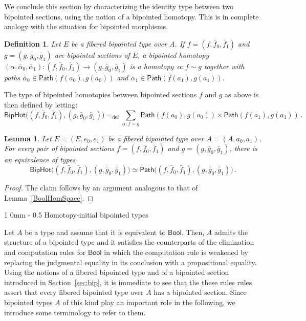 \documentclass[10pt,a4paper,oneside,reqno]{amsart}
\makeatletter
\numberwithin{equation}{section}
\renewcommand{\section}{\@startsection
  {section}%
   {1}%
  {0mm}%
   {-\baselineskip}%
  {0.5\baselineskip}%
   {\Large\bfseries}}%
\theoremstyle{mythm}
\newtheorem{lemma}[theorem]{Lemma}
\theoremstyle{mydef}
\newtheorem{definition}[theorem]{Definition}
\theoremstyle{myrmk}
\newcommand{\defeq}{=_{\mathrm{def}}}
\newcommand{\co}{\colon}
\newcommand{\Id}{\mathsf{Path}}
\newcommand{\Bool}{\mathsf{Bool}}
\newcommand{\BipHot}{\mathsf{BipHot}}
\makeatother
\begin{document}
We conclude this section by characterizing the identity type between two bipointed sections, using
the notion of a bipointed homotopy. This is in complete analogy with the situation for bipointed
morphisms.


\begin{definition} \label{def:2cellsection} Let $E$ be a fibered bipointed type over $A$. If $f = (f, \bar{f}_0,\bar{f}_1)$ and $g = (g, \bar{g}_0, \bar{g}_1)$ are bipointed sections of $E$, a \emph{bipointed homotopy} 
$(\alpha, \bar{\alpha}_0, \bar{\alpha}_1) \co (f, \bar{f}_0, \bar{f}_1)  \rightarrow (g, \bar{g}_0, \bar{g}_1)$ 
is a homotopy~$\alpha \co f \sim g$ together with paths $\bar{\alpha}_0 \in \Id( f(a_0),  g(a_0))$ and $\bar{\alpha}_1 \in \Id ( f(a_1) , g(a_1))$. 
\end{definition} 

The type of bipointed homotopies between bipointed sections $f$ and $g$ as above is then defined by letting:
\[
\BipHot \big( (f, \bar{f}_0, \bar{f}_1), (g, \bar{g}_0, \bar{g}_1) \big) \defeq
\sum_{\alpha \co f \sim g} \Id ( f(a_0), g(a_0) ) \times \Id ( f(a_1) , g(a_1) ) \, .
\]


\begin{lemma} Let $E = (E, e_0, e_1)$ be a fibered bipointed type over $A = (A, a_0, a_1)$. 
For every pair of bipointed sections $f = (f, \bar{f}_0, \bar{f}_1)$ and $g = (g, \bar{g}_0, \bar{g}_1)$, 
there is an equivalence of types
\[
\BipHot \big( (f, \bar{f}_0, \bar{f}_1), (g, \bar{g}_0, \bar{g}_1) \big)
\simeq 
\Id\big( (f, \bar{f}_0, \bar{f}_1), (g, \bar{g}_0, \bar{g}_1) \big) \, .
\]
\end{lemma}


\begin{proof} The claim follows by an argument analogous to that of Lemma~\ref{BoolHomSpace}.
\end{proof}







\section{Homotopy-initial bipointed types} 



Let $A$ be a type and assume that it is equivalent to $\Bool$. Then, $A$ admits the structure of a bipointed type and
it satisfies the counterparts of the elimination and computation rules for $\Bool$ in which the computation rule is 
weakened by replacing the judgmental equality in its conclusion with a propositional equality. Using the notions of a fibered bipointed type and of a bipointed section introduced in Section~\ref{sec:bip}, it is immediate to see that the these rules rules assert that every fibered bipointed type over $A$ has a bipointed section. Since bipointed types $A$ of this kind  play an important role in the following, we introduce some terminology to refer to them.
\end{document}
